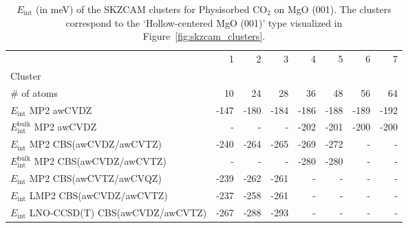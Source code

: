 \begin{table}
\caption{\label{tab:system_eint_mgo_co2_physisorbed}$E_\textrm{int}$ (in meV) of the SKZCAM clusters for Physisorbed CO$_2$ on MgO (001). The clusters correspond to the `Hollow-centered MgO (001)' type visualized in Figure~\ref{fig:skzcam_clusters}.}
\begin{adjustbox}{center,max width=1.4\textwidth}
\begin{tabular}{lrrrrrrr}
\toprule
 & 1 & 2 & 3 & 4 & 5 & 6 & 7 \\ 
Cluster &  &  &  &  &  &  &  \\
\midrule
\# of atoms & 10 & 24 & 28 & 36 & 48 & 56 & 64 \\
$E_\textrm{int}$ MP2 awCVDZ & -147 & -180 & -184 & -186 & -188 & -189 & -192 \\
$E_\textrm{int}^\textrm{bulk}$ MP2 awCVDZ & - & - & - & -202 & -201 & -200 & -200 \\
$E_\textrm{int}$ MP2 CBS(awCVDZ/awCVTZ) & -240 & -264 & -265 & -269 & -272 & - & - \\
$E_\textrm{int}^\textrm{bulk}$ MP2 CBS(awCVDZ/awCVTZ) & - & - & - & -280 & -280 & - & - \\
$E_\textrm{int}$ MP2 CBS(awCVTZ/awCVQZ) & -239 & -262 & -261 & - & - & - & - \\
$E_\textrm{int}$ LMP2 CBS(awCVDZ/awCVTZ) & -237 & -258 & -261 & - & - & - & - \\
$E_\textrm{int}$ LNO-CCSD(T) CBS(awCVDZ/awCVTZ) & -267 & -288 & -293 & - & - & - & - \\
\bottomrule
\end{tabular}
\end{adjustbox}
\end{table}

